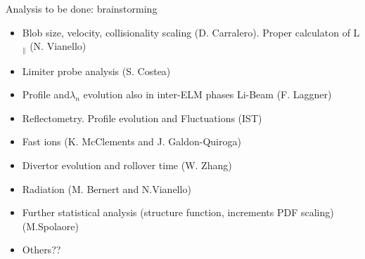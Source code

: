 \documentclass[10pt, compress]{beamer}
\begin{document}
\begin{frame}{Analysis to be done: brainstorming}
  \begin{itemize}
    \item Blob size, velocity, collisionality scaling
      (D. Carralero). Proper calculaton of L$_{\parallel}$ (N. Vianello)
    \item Limiter probe analysis (S. Costea)
    \item Profile and$\lambda_n$ evolution also in inter-ELM phases Li-Beam
      (F. Laggner)
    \item Reflectometry. Profile evolution and Fluctuations (IST)
    \item Fast ions (K. McClements and J. Galdon-Quiroga)
    \item Divertor evolution and rollover time (W. Zhang)
    \item Radiation (M. Bernert and N.Vianello)
    \item Further statistical analysis (structure function, increments
      PDF scaling) (M.Spolaore)
    \item Others??
  \end{itemize}
\end{frame}
\end{document}

